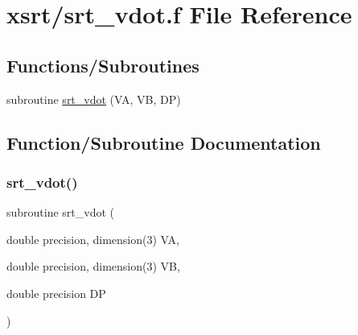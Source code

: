 \hypertarget{srt__vdot_8f}{}\section{xsrt/srt\+\_\+vdot.f File Reference}
\label{srt__vdot_8f}
\subsection*{Functions/\+Subroutines}
\begin{DoxyCompactItemize}
\item 
subroutine \hyperlink{srt__vdot_8f_af866b9ff4b8b1cf4c33c913b96a4dd85}{srt\+\_\+vdot} (VA, VB, DP)
\end{DoxyCompactItemize}


\subsection{Function/\+Subroutine Documentation}
\mbox{\label{srt__vdot_8f_af866b9ff4b8b1cf4c33c913b96a4dd85}} 
\subsubsection{\texorpdfstring{srt\+\_\+vdot()}{srt\_vdot()}}
{\footnotesize\ttfamily subroutine srt\+\_\+vdot (\begin{DoxyParamCaption}\item[{double precision, dimension(3)}]{VA,  }\item[{double precision, dimension(3)}]{VB,  }\item[{double precision}]{DP }\end{DoxyParamCaption})}

